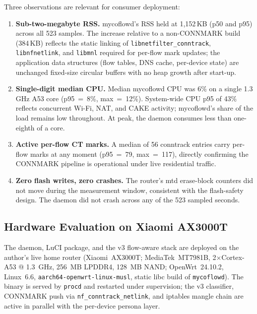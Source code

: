\documentclass[conference]{IEEEtran}
\begin{document}
Three observations are relevant for consumer deployment:
\begin{enumerate}
\item \textbf{Sub-two-megabyte RSS.}
  mycoflowd's RSS held at 1{,}152\,KB (p50 and p95) across all 523 samples.
  The increase relative to a non-CONNMARK build (384\,KB) reflects the
  static linking of \texttt{libnetfilter\_conntrack}, \texttt{libnfnetlink},
  and \texttt{libmnl} required for per-flow mark updates;
  the application data structures (flow tables, DNS cache, per-device state)
  are unchanged fixed-size circular buffers with no heap growth after
  start-up.
\item \textbf{Single-digit median CPU.}
  Median mycoflowd CPU was 6\% on a single 1.3\,GHz A53 core
  (p95~=~8\%, max~=~12\%).
  System-wide CPU p95 of 43\% reflects concurrent Wi-Fi, NAT, and CAKE
  activity; mycoflowd's share of the load remains low throughout.
  At peak, the daemon consumes less than one-eighth of a core.
\item \textbf{Active per-flow CT marks.}
  A median of 56 conntrack entries carry per-flow marks at any moment
  (p95~=~79, max~=~117), directly confirming the CONNMARK pipeline is
  operational under live residential traffic.
\item \textbf{Zero flash writes, zero crashes.}
  The router's mtd erase-block counters did not move during the measurement
  window, consistent with the flash-safety design.
  The daemon did not crash across any of the 523 sampled seconds.
\end{enumerate}

\subsection{Hardware Evaluation on Xiaomi AX3000T}
\label{subsec:hardware}

The daemon, LuCI package, and the v3 flow-aware stack are deployed on
the author's live home router
(Xiaomi~AX3000T; MediaTek~MT7981B, 2$\times$Cortex-A53 @ 1.3~GHz,
256~MB LPDDR4, 128~MB NAND; OpenWrt~24.10.2, Linux~6.6,
\texttt{aarch64-openwrt-linux-musl},
static libc build of \texttt{mycoflowd}).
The binary is served by \texttt{procd} and restarted under supervision;
the v3 classifier, CONNMARK push via \texttt{nf\_conntrack\_netlink},
and iptables mangle chain are active in parallel with the per-device
persona layer.
\end{document}
